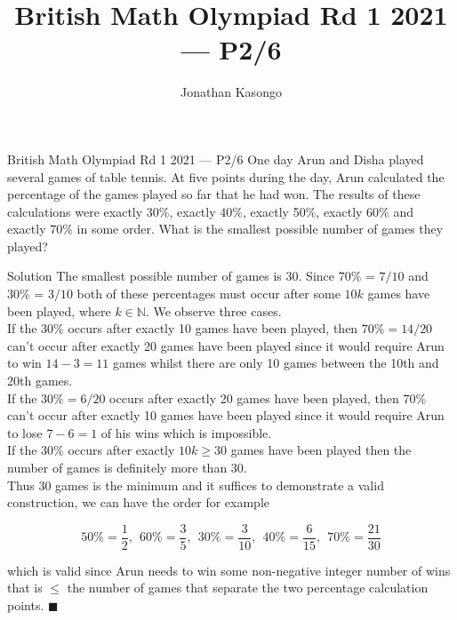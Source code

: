 \documentclass{article}
\author{Jonathan Kasongo}
\title{British Math Olympiad Rd 1 2021 --- P2/6}
\begin{document}
\maketitle

\begin{problem}{British Math Olympiad Rd 1 2021 --- P2/6}
One day Arun and Disha played several games of table tennis. At five points
during the day, Arun calculated the percentage of the games played so far
that he had won. The results of these calculations were exactly 30\%,
exactly 40\%, exactly 50\%, exactly 60\% and exactly 70\% in some order.
What is the smallest possible number of games they played?
\end{problem}

\begin{solution}{Solution}
The smallest possible number of games is 30.
Since 70\% = $7/10$ and 30\% = $3/10$ both of these percentages must occur
after some $10k$ games have been played, where $k \in \mathbb{N}$. We
observe three cases. \\

If the 30\% occurs after exactly 10 games have been played,
then $70\% = 14/20$ can't occur after exactly 20 games have been played
since it would require Arun to win $14-3 = 11$ games whilst there are only
10 games between the 10th and 20th games.\\

If the $30\% = 6/20$ occurs after exactly 20 games have been played, then
70\% can't occur after exactly 10 games have been played since it would
require Arun to lose $7-6 = 1$ of his wins which is impossible.\\

If the 30\% occurs after exactly $10k \geq 30$ games have been played then
the number of games is definitely more than 30.\\

Thus 30 games is the minimum and it suffices to demonstrate a
valid construction, we can have the order for example

$$
50\% = \frac12, \ \ 60\% = \frac35, \ \ 30\% = \frac{3}{10}, \ \ 40\% = \frac{6}{15}, \ \ 70\% = \frac{21}{30}
$$

which is valid since Arun needs to win some non-negative integer number
of wins that is $\leq$ the number of games that separate the two percentage
calculation points. $\blacksquare$
\end{solution}
\end{document}

